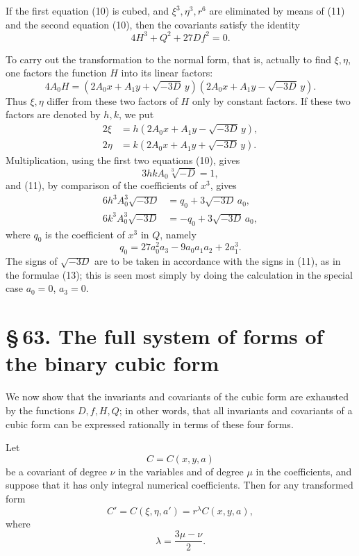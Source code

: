 \documentclass[11pt]{article}
\providecommand{\sect}[2]{\section*{\S\,#1. #2}}
\begin{document}
If the first equation (10) is cubed, and $\xi^3,\eta^3,r^6$ are eliminated by means of (11) and the second equation (10), then the covariants satisfy the identity
\begin{equation}
 4H^3+Q^2+27Df^2=0.
\tag{12}
\end{equation}

To carry out the transformation to the normal form, that is, actually to find $\xi,\eta$, one factors the function $H$ into its linear factors:
\[
 4A_0H=(2A_0x+A_1y+\sqrt{-3D}\,y)(2A_0x+A_1y-\sqrt{-3D}\,y).
\]
Thus $\xi,\eta$ differ from these two factors of $H$ only by constant factors. If these two factors are denoted by $h,k$, we put
\begin{equation}
\begin{aligned}
 2\xi&=h(2A_0x+A_1y-\sqrt{-3D}\,y),\\
 2\eta&=k(2A_0x+A_1y+\sqrt{-3D}\,y).
\end{aligned}
\tag{13}
\end{equation}
Multiplication, using the first two equations (10), gives
\begin{equation}
 3hkA_0\sqrt[3]{-D}=1,
\tag{14}
\end{equation}
and (11), by comparison of the coefficients of $x^3$, gives
\begin{equation}
\begin{aligned}
 6h^3A_0^3\sqrt{-3D}&= q_0+3\sqrt{-3D}\,a_0,\\
 6k^3A_0^3\sqrt{-3D}&=-q_0+3\sqrt{-3D}\,a_0,
\end{aligned}
\tag{15}
\end{equation}
where $q_0$ is the coefficient of $x^3$ in $Q$, namely
\begin{equation}
 q_0=27a_0^2a_3-9a_0a_1a_2+2a_1^3.
\tag{16}
\end{equation}
The signs of $\sqrt{-3D}$ are to be taken in accordance with the signs in (11), as in the formulae (13); this is seen most simply by doing the calculation in the special case $a_0=0$, $a_3=0$.

\sect{63}{The full system of forms of the binary cubic form}

We now show that the invariants and covariants of the cubic form are exhausted by the functions $D,f,H,Q$; in other words, that all invariants and covariants of a cubic form can be expressed rationally in terms of these four forms.

Let
\[
 C=C(x,y,a)
\]
be a covariant of degree $\nu$ in the variables and of degree $\mu$ in the coefficients, and suppose that it has only integral numerical coefficients. Then for any transformed form
\begin{equation}
 C'=C(\xi,\eta,a')=r^\lambda C(x,y,a),
\tag{1}
\end{equation}
where
\begin{equation}
 \lambda=\frac{3\mu-\nu}{2}.
\tag{2}
\end{equation}
\end{document}
